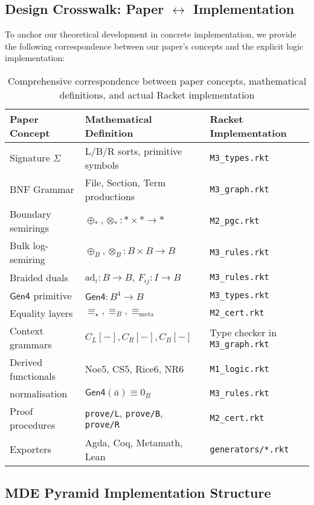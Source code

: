 \subsection{Design Crosswalk: Paper $\leftrightarrow$ Implementation}

To anchor our theoretical development in concrete implementation, we provide the following correspondence between our paper's concepts and the explicit logic implementation:

\begin{table}[h]
\centering
\begin{tabular}{|l|l|l|}
\hline
Paper Concept & Mathematical Definition & Racket Implementation \\
\hline
Signature $\Sigma$ & L/B/R sorts, primitive symbols & \texttt{M3\_types.rkt} \\
BNF Grammar & File, Section, Term productions & \texttt{M3\_graph.rkt} \\
Boundary semirings & $\oplus_*, \otimes_* : * \times * \to *$ & \texttt{M2\_pgc.rkt} \\
Bulk log-semiring & $\oplus_B, \otimes_B : B \times B \to B$ & \texttt{M3\_rules.rkt} \\
Braided duals & $\text{ad}_i : B \to B$, $F_{ij} : I \to B$ & \texttt{M3\_rules.rkt} \\
$\mathsf{Gen4}$ primitive & $\mathsf{Gen4} : B^4 \to B$ & \texttt{M3\_types.rkt} \\
Equality layers & $\equiv_\star, \equiv_B, \equiv_{\text{meta}}$ & \texttt{M2\_cert.rkt} \\
Context grammars & $C_L[-], C_R[-], C_B[-]$ & Type checker in \texttt{M3\_graph.rkt} \\
Derived functionals & Noe5, CS5, Rice6, NR6 & \texttt{M1\_logic.rkt} \\
normalisation & $\mathsf{Gen4}(\bar{a}) \equiv 0_B$ & \texttt{M3\_rules.rkt} \\
Proof procedures & \texttt{prove/L}, \texttt{prove/B}, \texttt{prove/R} & \texttt{M2\_cert.rkt} \\
Exporters & Agda, Coq, Metamath, Lean & \texttt{generators/*.rkt} \\
\hline
\end{tabular}
\caption{Comprehensive correspondence between paper concepts, mathematical definitions, and actual Racket implementation}
\label{tab:design-crosswalk}
\end{table}

\subsection{MDE Pyramid Implementation Structure}

